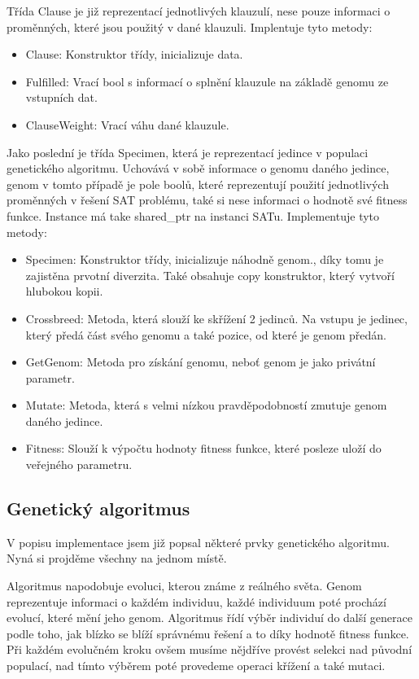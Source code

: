 \documentclass{article}
\begin{document}
    Třída Clause je již reprezentací jednotlivých klauzulí, nese pouze informaci o proměnných, které jsou použitý v dané klauzuli. Implentuje tyto metody:

    \begin{itemize}
        \item {Clause: Konstruktor třídy, inicializuje data.}
        \item {Fulfilled: Vrací bool s informací o splnění klauzule na základě genomu ze vstupních dat.}
        \item {ClauseWeight: Vrací váhu dané klauzule.}
    \end{itemize}

    Jako poslední je třída Specimen, která je reprezentací jedince v populaci genetického algoritmu. Uchovává v sobě informace o genomu daného jedince,
    genom v tomto případě je pole boolů, které reprezentují použití jednotlivých proměnných v řešení SAT problému, také si nese informaci o hodnotě své fitness funkce.
    Instance má take shared\_ptr na instanci SATu. Implementuje tyto metody:

    \begin{itemize}
        \item {Specimen: Konstruktor třídy, inicializuje náhodně genom., díky tomu je zajistěna prvotní diverzita. Také obsahuje copy konstruktor, který vytvoří hlubokou kopii.}
        \item {Crossbreed: Metoda, která slouží ke skřížení 2 jedinců. Na vstupu je jedinec, který předá část svého genomu a také pozice, od které je genom předán.}
        \item {GetGenom: Metoda pro získání genomu, neboť genom je jako privátní parametr.}
        \item {Mutate: Metoda, která s velmi nízkou pravděpodobností zmutuje genom daného jedince.}
        \item {Fitness: Slouží k výpočtu hodnoty fitness funkce, které posleze uloží do veřejného parametru.}
    \end{itemize}

    \subsection{Genetický algoritmus}

    V popisu implementace jsem již popsal některé prvky genetického algoritmu. Nyná si projděme všechny na jednom místě.

    Algoritmus napodobuje evoluci, kterou známe z reálného světa. Genom reprezentuje informaci o každém individuu, každé individuum poté prochází
    evolucí, které mění jeho genom. Algoritmus řídí výběr individuí do další generace podle toho, jak blízko se blíží správnému řešení a to díky
    hodnotě fitness funkce. Při každém evolučném kroku ovšem musíme nějdříve provést selekci nad původní populací, nad tímto výběrem poté provedeme
    operaci křížení a také mutaci.
\end{document}
